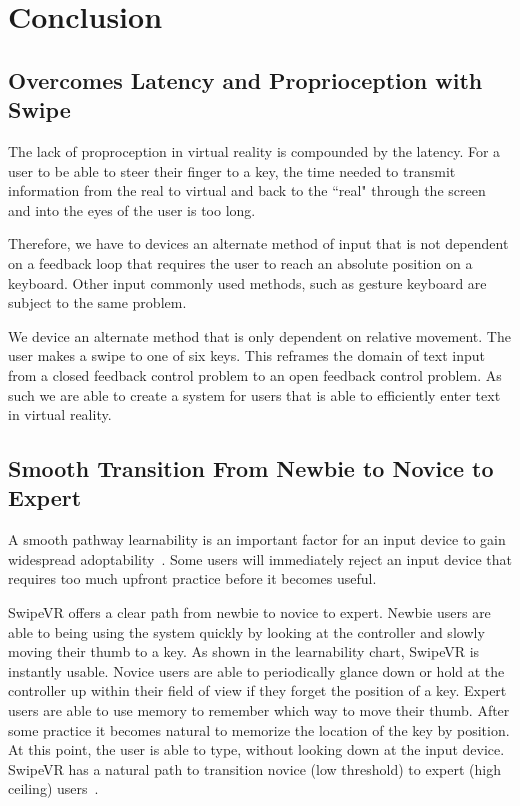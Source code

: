 \section{Conclusion}

\subsection{Overcomes Latency and Proprioception with Swipe}
The lack of proproception in virtual reality is compounded by the latency.
For a user to be able to steer their finger to a key, the time needed to transmit information from the real to virtual and back to the ``real" through the  screen and into the eyes of the user is too long.

Therefore, we have to devices an alternate method of input that is not dependent on a feedback loop that requires the user to reach an absolute position on a keyboard.
Other input commonly used methods, such as gesture keyboard are subject to the same problem.

We device an alternate method that is only dependent on relative movement.
The user makes a swipe to one of six keys.
This reframes the domain of text input from a closed  feedback control problem to an open feedback control problem.
As such we are able to create a system for users that is able to efficiently enter text in virtual reality.


\subsection{Smooth Transition From Newbie to Novice to Expert }

A smooth pathway learnability is an important factor for an input device to gain widespread adoptability~\cite{}.
Some users will immediately reject an input device that requires too much upfront practice before it becomes useful.

SwipeVR offers a clear path from newbie to novice to expert. Newbie users are able to being using the system quickly by looking at the controller and slowly moving their thumb to a key.
As shown in the learnability chart, SwipeVR is instantly usable.
Novice users are able to periodically glance down or hold at the controller up within their field of view if they forget the position of a key.
Expert users are able to use memory to remember which way to move their thumb.
After some practice it becomes natural to memorize the location of the key by position.
At this point, the user is able to type, without looking down at the input device.
SwipeVR has a natural path to transition novice (low threshold) to expert (high ceiling) users~\cite{grover2013computational}.

